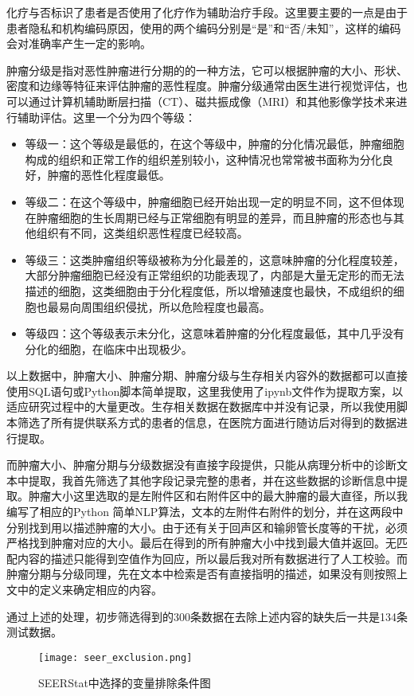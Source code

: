 化疗与否标识了患者是否使用了化疗作为辅助治疗手段。这里要主要的一点是由于患者隐私和机构编码原因，使用的两个编码分别是“是”和“否/未知”，这样的编码会对准确率产生一定的影响。

肿瘤分级是指对恶性肿瘤进行分期的的一种方法，它可以根据肿瘤的大小、形状、密度和边缘等特征来评估肿瘤的恶性程度。肿瘤分级通常由医生进行视觉评估，也可以通过计算机辅助断层扫描（CT）、磁共振成像（MRI）和其他影像学技术来进行辅助评估。这里一个分为四个等级：

\begin{itemize}
\item 等级一：这个等级是最低的，在这个等级中，肿瘤的分化情况最低，肿瘤细胞构成的组织和正常工作的组织差别较小，这种情况也常常被书面称为分化良好，肿瘤的恶性化程度最低。
\item 等级二：在这个等级中，肿瘤细胞已经开始出现一定的明显不同，这不但体现在肿瘤细胞的生长周期已经与正常细胞有明显的差异，而且肿瘤的形态也与其他组织有不同，这类组织恶性程度已经较高。
\item 等级三：这类肿瘤组织等级被称为分化最差的，这意味肿瘤的分化程度较差，大部分肿瘤细胞已经没有正常组织的功能表现了，内部是大量无定形的而无法描述的细胞，这类细胞由于分化程度低，所以增殖速度也最快，不成组织的细胞也最易向周围组织侵扰，所以危险程度也最高。
\item 等级四：这个等级表示未分化，这意味着肿瘤的分化程度最低，其中几乎没有分化的细胞，在临床中出现极少。
\end{itemize}

以上数据中，肿瘤大小、肿瘤分期、肿瘤分级与生存相关内容外的数据都可以直接使用SQL语句或Python脚本简单提取，这里我使用了ipynb文件作为提取方案，以适应研究过程中的大量更改。生存相关数据在数据库中并没有记录，所以我使用脚本筛选了所有提供联系方式的患者的信息，在医院方面进行随访后对得到的数据进行提取。

而肿瘤大小、肿瘤分期与分级数据没有直接字段提供，只能从病理分析中的诊断文本中提取，我首先筛选了其他字段记录完整的患者，并在这些数据的诊断信息中提取。肿瘤大小这里选取的是左附件区和右附件区中的最大肿瘤的最大直径，所以我编写了相应的Python 简单NLP算法，文本的左附件右附件的划分，并在这两段中分别找到用以描述肿瘤的大小。由于还有关于回声区和输卵管长度等的干扰，必须严格找到肿瘤对应的大小。最后在得到的所有肿瘤大小中找到最大值并返回。无匹配内容的描述只能得到空值作为回应，所以最后我对所有数据进行了人工校验。而肿瘤分期与分级同理，先在文本中检索是否有直接指明的描述，如果没有则按照上文中的定义来确定相应的内容。

通过上述的处理，初步筛选得到的300条数据在去除上述内容的缺失后一共是134条测试数据。

\begin{figure}[!htbp]
    \centering
    \texttt{[image: seer\_exclusion.png]}
    \caption{SEERStat中选择的变量排除条件图} \label{fig:seer_exclusion}
\end{figure}
